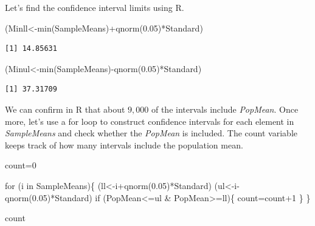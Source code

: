 \documentclass[
  letterpaper,
  DIV=11,
  numbers=noendperiod]{scrreprt}
\newenvironment{Shaded}{\begin{snugshade}}{\end{snugshade}}
\newcommand{\ControlFlowTok}[1]{\textcolor[rgb]{0.00,0.23,0.31}{#1}}
\newcommand{\DecValTok}[1]{\textcolor[rgb]{0.68,0.00,0.00}{#1}}
\newcommand{\FloatTok}[1]{\textcolor[rgb]{0.68,0.00,0.00}{#1}}
\newcommand{\FunctionTok}[1]{\textcolor[rgb]{0.28,0.35,0.67}{#1}}
\newcommand{\NormalTok}[1]{\textcolor[rgb]{0.00,0.23,0.31}{#1}}
\newcommand{\OtherTok}[1]{\textcolor[rgb]{0.00,0.23,0.31}{#1}}
\newcommand{\SpecialCharTok}[1]{\textcolor[rgb]{0.37,0.37,0.37}{#1}}
\begin{document}
Let's find the confidence interval limits using R.

\begin{Shaded}
\begin{Highlighting}[numbers=left,,]
\NormalTok{(Minll}\OtherTok{\textless{}{-}}\FunctionTok{min}\NormalTok{(SampleMeans)}\SpecialCharTok{+}\FunctionTok{qnorm}\NormalTok{(}\FloatTok{0.05}\NormalTok{)}\SpecialCharTok{*}\NormalTok{Standard)}
\end{Highlighting}
\end{Shaded}

\begin{verbatim}
[1] 14.85631
\end{verbatim}

\begin{Shaded}
\begin{Highlighting}[numbers=left,,]
\NormalTok{(Minul}\OtherTok{\textless{}{-}}\FunctionTok{min}\NormalTok{(SampleMeans)}\SpecialCharTok{{-}}\FunctionTok{qnorm}\NormalTok{(}\FloatTok{0.05}\NormalTok{)}\SpecialCharTok{*}\NormalTok{Standard)}
\end{Highlighting}
\end{Shaded}

\begin{verbatim}
[1] 37.31709
\end{verbatim}

We can confirm in R that about \(9,000\) of the intervals include
\emph{PopMean}. Once more, let's use a for loop to construct confidence
intervals for each element in \emph{SampleMeans} and check whether the
\emph{PopMean} is included. The count variable keeps track of how many
intervals include the population mean.

\begin{Shaded}
\begin{Highlighting}[numbers=left,,]
\NormalTok{count}\OtherTok{=}\DecValTok{0}

\ControlFlowTok{for}\NormalTok{ (i }\ControlFlowTok{in}\NormalTok{ SampleMeans)\{}
\NormalTok{  (ll}\OtherTok{\textless{}{-}}\NormalTok{i}\SpecialCharTok{+}\FunctionTok{qnorm}\NormalTok{(}\FloatTok{0.05}\NormalTok{)}\SpecialCharTok{*}\NormalTok{Standard)}
\NormalTok{  (ul}\OtherTok{\textless{}{-}}\NormalTok{i}\SpecialCharTok{{-}}\FunctionTok{qnorm}\NormalTok{(}\FloatTok{0.05}\NormalTok{)}\SpecialCharTok{*}\NormalTok{Standard)}
  \ControlFlowTok{if}\NormalTok{ (PopMean}\SpecialCharTok{\textless{}=}\NormalTok{ul }\SpecialCharTok{\&}\NormalTok{ PopMean}\SpecialCharTok{\textgreater{}=}\NormalTok{ll)\{}
\NormalTok{    count}\OtherTok{=}\NormalTok{count}\SpecialCharTok{+}\DecValTok{1}
\NormalTok{  \}}
\NormalTok{\}}

\NormalTok{count}
\end{Highlighting}
\end{Shaded}
\end{document}
